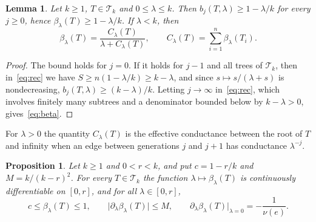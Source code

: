 \documentclass[11pt]{amsart}
\newtheorem{proposition}[theorem]{Proposition}
\newtheorem{lemma}[theorem]{Lemma}
\theoremstyle{definition}
\newcommand{\cT}{\mathcal{T}}
\begin{document}
\begin{lemma}\label{lem:lower}
Let $k\ge1$, $T\in\cT_k$ and $0\le\lambda\le k$. Then $b_j(T,\lambda)\ge1-\lambda/k$ for every $j\ge0$, hence
$\beta_\lambda(T)\ge1-\lambda/k$. If $\lambda<k$, then
\begin{equation}\label{eq:beta}
   \beta_\lambda(T)=\frac{C_\lambda(T)}{\lambda+C_\lambda(T)},\qquad C_\lambda(T)=\sum_{i=1}^n\beta_\lambda(T_i) .
\end{equation}
\end{lemma}

\begin{proof}
The bound holds for $j=0$. If it holds for $j-1$ and all trees of $\cT_k$, then in~\eqref{eq:rec} we have
$S\ge n(1-\lambda/k)\ge k-\lambda$, and since $s\mapsto s/(\lambda+s)$ is nondecreasing,
$b_j(T,\lambda)\ge(k-\lambda)/k$. Letting $j\to\infty$ in~\eqref{eq:rec}, which involves finitely many subtrees
and a denominator bounded below by $k-\lambda>0$, gives~\eqref{eq:beta}.
\end{proof}

For $\lambda>0$ the quantity $C_\lambda(T)$ is the effective conductance between the root of $T$ and infinity
when an edge between generations $j$ and $j+1$ has conductance $\lambda^{-j}$.

\begin{proposition}\label{prop:C1}
Let $k\ge1$ and $0<r<k$, and put $c=1-r/k$ and $M=k/(k-r)^2$. For every $T\in\cT_k$ the function
$\lambda\mapsto\beta_\lambda(T)$ is continuously differentiable on $[0,r]$, and for all $\lambda\in[0,r]$,
\[
   c\le\beta_\lambda(T)\le1,\qquad \bigl|\partial_\lambda\beta_\lambda(T)\bigr|\le M,\qquad
   \partial_\lambda\beta_\lambda(T)\big|_{\lambda=0}=-\frac1{\nu(e)} .
\]
\end{proposition}
\end{document}
